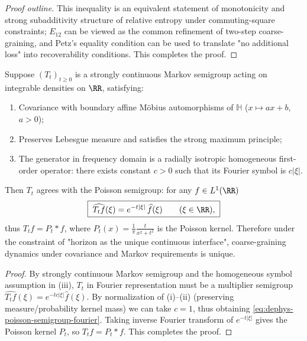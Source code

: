 \begin{proof}[Proof outline]
This inequality is an equivalent statement of monotonicity and strong subadditivity structure of relative entropy under commuting-square constraints;
\(E_{12}\) can be viewed as the common refinement of two-step coarse-graining, and Petz's equality condition can be used to translate "no additional loss" into recoverability conditions. This completes the proof.
\end{proof}

\begin{theorem}\label{thm:dephys-mobius-markov-unique-poisson}
Suppose \((T_t)_{t\ge 0}\) is a strongly continuous Markov semigroup acting on integrable densities on \(\RR\), satisfying:
\begin{enumerate}
  \item[(i)] Covariance with boundary affine Möbius automorphisms of \(\mathbb{H}\) (\(x\mapsto ax+b\), \(a>0\));
  \item[(ii)] Preserves Lebesgue measure and satisfies the strong maximum principle;
  \item[(iii)] The generator in frequency domain is a radially isotropic homogeneous first-order operator: there exists constant \(c>0\) such that its Fourier symbol is \(c|\xi|\).
\end{enumerate}
Then \(T_t\) agrees with the Poisson semigroup: for any \(f\in L^1(\RR)\)
\begin{equation}\label{eq:dephys-poisson-semigroup-fourier}
\boxed{\;
\widehat{T_t f}(\xi)=e^{-t|\xi|}\,\widehat f(\xi)\qquad(\xi\in\RR),\;}
\end{equation}
thus \(T_t f=P_t*f\), where \(P_t(x)=\frac{1}{\pi}\frac{t}{x^2+t^2}\) is the Poisson kernel.
Therefore under the constraint of "horizon as the unique continuous interface", coarse-graining dynamics under covariance and Markov requirements is unique.
\end{theorem}

\begin{proof}
By strongly continuous Markov semigroup and the homogeneous symbol assumption in (iii), \(T_t\) in Fourier representation must be a multiplier semigroup
\(
\widehat{T_t f}(\xi)=e^{-t c|\xi|}\widehat f(\xi)
\).
By normalization of (i)–(ii) (preserving measure/probability kernel mass) we can take \(c=1\), thus obtaining \eqref{eq:dephys-poisson-semigroup-fourier}.
Taking inverse Fourier transform of \(e^{-t|\xi|}\) gives the Poisson kernel \(P_t\), so \(T_t f=P_t*f\). This completes the proof.
\end{proof}

